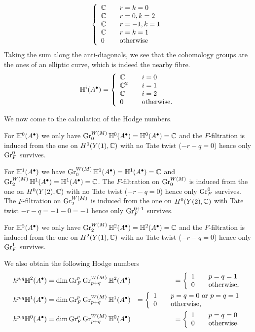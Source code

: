 \documentclass[../main.tex]{subfiles}
\begin{document}
\begin{es}
\[    \left\{\begin{array}{ll} 
 \mathbb{C} &\quad r = k = 0 \\ 
 \mathbb{C} &\quad r = 0, k = 2 \\
  \mathbb{C} &\quad r = -1, k = 1 \\
  \mathbb{C} &\quad r = k = 1 \\
0 &\quad \text{otherwise}  \end{array}\right.
\]
Taking the sum along the anti-diagonals, we see that the cohomology groups are the ones of an elliptic curve, which is indeed the nearby fibre.
\[
\mathbb{H}^i(A^\bullet)= \left\{\begin{array}{ll} 
 \mathbb{C} &\quad i = 0 \\ 
  \mathbb{C}^2 &\quad i = 1 \\
  \mathbb{C} &\quad i =2 \\
0 &\quad \text{otherwise} . \end{array}\right.
\]

We now come to the calculation of the Hodge numbers.


For $\mathbb{H}^0(A^\bullet)$ we only have $\operatorname{Gr}^{W(M)}_0 \mathbb{H}^0(A^\bullet) = \mathbb{H}^0(A^\bullet) = \mathbb{C}$ and the $F$-filtration is induced from the one on $H^0(Y(1),\mathbb{C})$ with no Tate twist ($-r-q=0$) hence only $\operatorname{Gr}_F^0$ survives.


For $\mathbb{H}^1(A^\bullet)$ we have $\operatorname{Gr}^{W(M)}_0 \mathbb{H}^1(A^\bullet) = \mathbb{H}^1(A^\bullet) = \mathbb{C}$ and $\operatorname{Gr}^{W(M)}_2 \mathbb{H}^1(A^\bullet) = \mathbb{H}^1(A^\bullet) = \mathbb{C}$. The $F$-filtration on $\operatorname{Gr}_0^{W(M)}$ is induced from the one on $H^0(Y(2),\mathbb{C})$ with no Tate twist ($-r-q=0$) hence only $\operatorname{Gr}_F^0$ survives. The $F$-filtration on $\operatorname{Gr}_2^{W(M)}$ is induced from the one on $H^0(Y(2),\mathbb{C})$ with Tate twist $-r-q=-1-0=-1$ hence only $\operatorname{Gr}_F^{0+1}$ survives. 


For $\mathbb{H}^2(A^\bullet)$ we only have $\operatorname{Gr}^{W(M)}_2 \mathbb{H}^2(A^\bullet) = \mathbb{H}^2(A^\bullet) = \mathbb{C}$ and the $F$-filtration is induced from the one on $H^2(Y(1),\mathbb{C})$ with no Tate twist ($-r-q=0$) hence only $\operatorname{Gr}_F^1$ survives.

We also obtain the following Hodge numbers
\begin{eqnarray*}h^{p,q}\mathbb{H}^2(A^\bullet)&=  \dim \operatorname{Gr}^p_F \operatorname{Gr}^{W(M)}_{p+q} \mathbb{H}^2(A^\bullet)  &=\left\{\begin{array}{ll} 1 &\quad p=q=1\\ 0&\quad\hbox{otherwise,}\end{array}\right.\\
h^{p,q}\mathbb{H}^1(A^\bullet)&= \dim \operatorname{Gr}^p_F \operatorname{Gr}^{W(M)}_{p+q} \mathbb{H}^1(A^\bullet)   &=\left\{\begin{array}{ll} 1 &\quad p=q=0\hbox{ or }p=q=1\\ 0&\quad\hbox{otherwise,}\end{array}\right.\\
h^{p,q}\mathbb{H}^0(A^\bullet)&= \dim \operatorname{Gr}^p_F \operatorname{Gr}^{W(M)}_{p+q} \mathbb{H}^0(A^\bullet)  &=\left\{\begin{array}{ll} 1 &\quad p=q=0\\ 0&\quad\hbox{otherwise.}\end{array}\right.
\end{eqnarray*}


\end{es}
\end{document}
